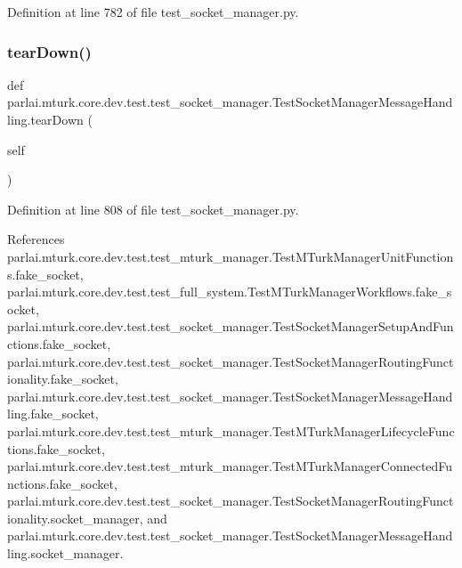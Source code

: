 Definition at line 782 of file test\+\_\+socket\+\_\+manager.\+py.

\mbox{\label{classparlai_1_1mturk_1_1core_1_1dev_1_1test_1_1test__socket__manager_1_1TestSocketManagerMessageHandling_a6ac379f0b0dc0303890f13ffb0dd4364}} 
\subsubsection{\texorpdfstring{tear\+Down()}{tearDown()}}
{\footnotesize\ttfamily def parlai.\+mturk.\+core.\+dev.\+test.\+test\+\_\+socket\+\_\+manager.\+Test\+Socket\+Manager\+Message\+Handling.\+tear\+Down (\begin{DoxyParamCaption}\item[{}]{self }\end{DoxyParamCaption})}



Definition at line 808 of file test\+\_\+socket\+\_\+manager.\+py.



References parlai.\+mturk.\+core.\+dev.\+test.\+test\+\_\+mturk\+\_\+manager.\+Test\+M\+Turk\+Manager\+Unit\+Functions.\+fake\+\_\+socket, parlai.\+mturk.\+core.\+dev.\+test.\+test\+\_\+full\+\_\+system.\+Test\+M\+Turk\+Manager\+Workflows.\+fake\+\_\+socket, parlai.\+mturk.\+core.\+dev.\+test.\+test\+\_\+socket\+\_\+manager.\+Test\+Socket\+Manager\+Setup\+And\+Functions.\+fake\+\_\+socket, parlai.\+mturk.\+core.\+dev.\+test.\+test\+\_\+socket\+\_\+manager.\+Test\+Socket\+Manager\+Routing\+Functionality.\+fake\+\_\+socket, parlai.\+mturk.\+core.\+dev.\+test.\+test\+\_\+socket\+\_\+manager.\+Test\+Socket\+Manager\+Message\+Handling.\+fake\+\_\+socket, parlai.\+mturk.\+core.\+dev.\+test.\+test\+\_\+mturk\+\_\+manager.\+Test\+M\+Turk\+Manager\+Lifecycle\+Functions.\+fake\+\_\+socket, parlai.\+mturk.\+core.\+dev.\+test.\+test\+\_\+mturk\+\_\+manager.\+Test\+M\+Turk\+Manager\+Connected\+Functions.\+fake\+\_\+socket, parlai.\+mturk.\+core.\+dev.\+test.\+test\+\_\+socket\+\_\+manager.\+Test\+Socket\+Manager\+Routing\+Functionality.\+socket\+\_\+manager, and parlai.\+mturk.\+core.\+dev.\+test.\+test\+\_\+socket\+\_\+manager.\+Test\+Socket\+Manager\+Message\+Handling.\+socket\+\_\+manager.

